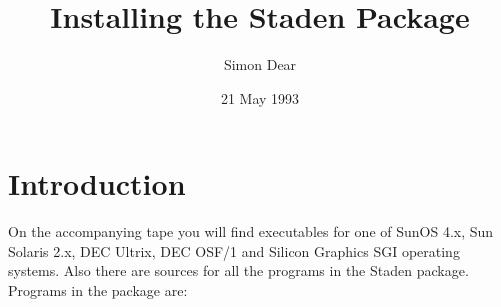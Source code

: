 
\title{Installing the Staden Package}
\author{Simon Dear}
\date{21 May 1993}




\maketitle



\section{Introduction}

On the accompanying tape you will find executables for 
one of SunOS 4.x, Sun
Solaris 2.x, DEC Ultrix, DEC OSF/1 and Silicon Graphics SGI operating systems.
Also there are sources for all the programs in the Staden package.
Programs in the package are:
